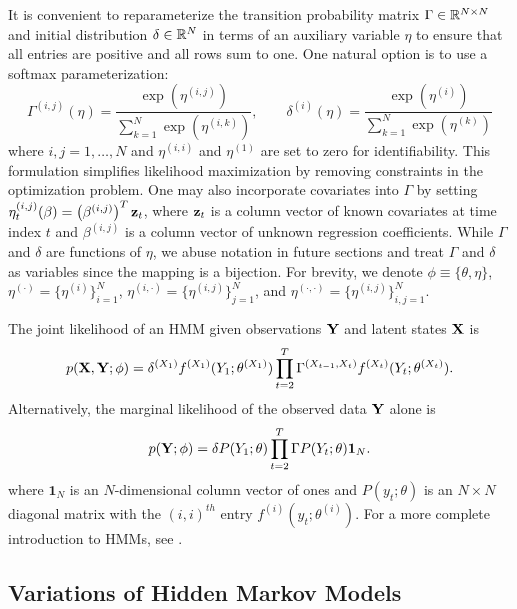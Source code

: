 It is convenient to reparameterize the transition probability matrix $\Gamma \in \mathbb{R}^{N \times N}$ and initial distribution $\delta \in \mathbb{R}^N$ in terms of an auxiliary variable $\eta$ to ensure that all entries are positive and all rows sum to one. One natural option is to use a softmax parameterization: %
%
\begin{equation}
    \Gamma^{(i,j)}(\eta) = \frac{\exp(\eta^{(i,j)})}{\sum_{k=1}^N \exp(\eta^{(i,k)})}, \qquad \delta^{(i)}(\eta) = \frac{\exp(\eta^{(i)})}{\sum_{k=1}^N \exp(\eta^{(k)})}
    \label{eqn:reparam}
\end{equation}
%
where $i,j = 1,\ldots,N$ and $\eta^{(i,i)}$ and $\eta^{(1)}$ are set to zero for identifiability. This formulation simplifies likelihood maximization by removing constraints in the optimization problem. One may also incorporate covariates into $\Gamma$ by setting $\eta_t^{(i,j)}(\beta) = \left(\beta^{(i,j)}\right)^T \mathbf{z}_t$, where $\mathbf{z}_t$ is a column vector of known covariates at time index $t$ and $\beta^{(i,j)}$ is a column vector of unknown regression coefficients. While $\Gamma$ and $\delta$ are functions of $\eta$, we abuse notation in future sections and treat $\Gamma$ and $\delta$ as variables since the mapping is a bijection.
%
For brevity, we denote $\phi \equiv \{\theta,\eta\}$, $\eta^{(\cdot)} = \{\eta^{(i)}\}_{i=1}^N$, 
$\eta^{(i,\cdot)} = \{\eta^{(i,j)}\}_{j=1}^N$, and $\eta^{(\cdot,\cdot)} = \{\eta^{(i,j)}\}_{i,j=1}^N$. 

The joint likelihood of an HMM given observations $\mathbf{Y}$ and latent states $\mathbf{X}$ is
%
\begin{equation}
    p(\mathbf{X},\mathbf{Y};\phi) = \delta^{(X_1)} f^{(X_1)}(Y_1; \theta^{(X_1)}) \prod_{t=2}^T \Gamma^{(X_{t-1},X_t)} f^{(X_t)}(Y_t; \theta^{(X_t)}).
    \label{eqn:like}
\end{equation}
%
Alternatively, the marginal likelihood of the observed data $\mathbf{Y}$ alone is 
%
\begin{equation}
    p(\mathbf{Y};\phi) = \delta P(Y_1;\theta) \prod_{t=2}^T \Gamma P(Y_t;\theta) \mathbf{1}_N.
    \label{eqn:like_marginal}
\end{equation}
%
where $\mathbf{1}_N$ is an $N$-dimensional column vector of ones and $P(y_t;\theta)$ is an $N \times N$ diagonal matrix with the $(i,i)^{th}$ entry $f^{(i)}(y_t; \theta^{(i)})$. For a more complete introduction to HMMs, see \citet{Zucchini:2016}.


\subsection{Variations of Hidden Markov Models}
\label{subsec:HHMM}


